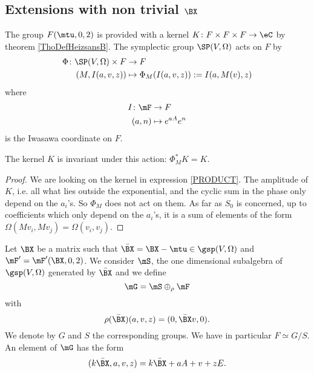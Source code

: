 \subsection{Extensions with non trivial \texorpdfstring{$\protect\BX $}{X}}	\label{subsecTrick}

The group $F(\mtu,0,2)$ is provided with a kernel $K\colon F\times F\times F\to \eC$ by theorem \ref{ThoDefHeizsansB}.  The symplectic group $\SP(V,\Omega)$ acts on $F$ by
\begin{equation}
\begin{aligned}
 \Phi\colon \SP(V,\Omega)\times F&\to F \\ 
(M,I(a,v,z))&\mapsto \Phi_{M}(I(a,v,z)):=I(a,M(v),z)
\end{aligned}
\end{equation}
where 
\begin{equation}
\begin{aligned}
 I\colon \mF&\to F \\ 
(a,n)&\mapsto  e^{aA} e^{n} 
\end{aligned}
\end{equation}
is the Iwasawa coordinate on $F$.

\begin{proposition}  
The kernel $K$ is invariant under this action: $\Phi^*_{M}K=K$.
 \label{PropkernelinvarSp}
\end{proposition}

\begin{proof}
We are looking on the kernel in expression \eqref{PRODUCT}. The amplitude of $K$, i.e. all what lies outside the exponential, and the cyclic sum in the phase only depend on the $a_{i}$'s. So $\Phi_{M}$ does not act on them. As far as $S_{0}$ is concerned, up to coefficients which only depend on the $a_{i}$'s, it is a sum of elements of the form $\Omega(Mv_{i},Mv_{j})=\Omega(v_{i},v_{j})$.
\end{proof}

Let $\BX $ be a matrix such that $\bar{\BX }=\BX -\mtu\in\gsp(V,\Omega)$ and $\mF'=\mF'(\BX,0,2)$. We consider $\mS$, the one dimensional subalgebra of $\gsp(V,\Omega)$ generated by $\bar{\BX}$ and we define
\begin{equation}
  \mG=\mS\oplus_{\rho}\mF
\end{equation} 
with 
\[ 
  \rho(\bar{\BX })(a,v,z)=(0,\bar{\BX }v,0).
\]
We denote by $G$ and $S$ the corresponding groups. We have in particular $F\simeq G/S$. An element of $\mG$ has the form
\begin{equation}	\label{EqDefkavzG}
  (k\bar\BX,a,v,z)=k\bar\BX+aA+v+zE.
\end{equation}


